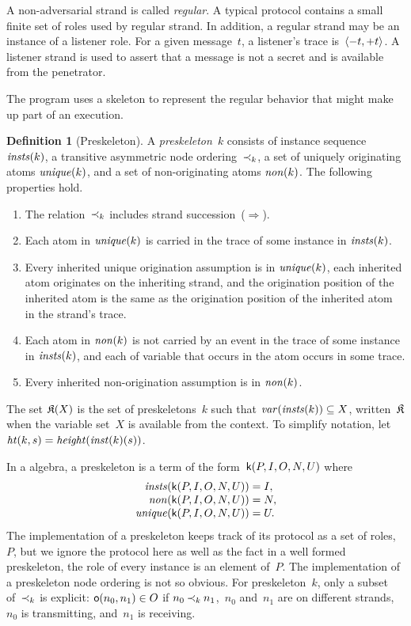 \documentclass[12pt]{article}
\theoremstyle{definition}
\newtheorem{defn}{Definition}[section]
\begin{document}
A non-adversarial strand is called 
\emph{regular}.  A typical protocol contains a small finite
set of roles used by regular strand.  In addition, a regular strand
may be an instance of a listener role.  For a given message~$t$, a
listener's trace is~$\langle\mathord - t,\mathord + t\rangle$.  A listener strand is
used to assert that a message is not a secret and is available from
the penetrator.

The {\cpsa} program uses a skeleton to represent the regular behavior
that might make up part of an execution.

\begin{defn}[Preskeleton]
A \emph{preskeleton}~$k$ consists of instance sequence
$\operatorname{\mathit{insts}}(k)$, a transitive asymmetric node ordering~$\mathbin{\prec_{k}}$, a
set of uniquely originating atoms $\operatorname{\mathit{unique}}(k)$, and a set of
non-originating atoms $\operatorname{\mathit{non}}(k)$.  The following properties hold.
\begin{enumerate}
\item The relation~$\mathbin{\prec_{k}}$ includes strand succession~($\Rightarrow$).
\item Each atom in $\operatorname{\mathit{unique}}(k)$ is carried in the trace of some
  instance in $\operatorname{\mathit{insts}}(k)$.
\item Every inherited unique origination assumption is in
  $\operatorname{\mathit{unique}}(k)$, each inherited atom originates on the
  inheriting strand, and the origination position of the inherited
  atom is the same as the origination position of the inherited atom
  in the strand's trace.
\item Each atom in $\operatorname{\mathit{non}}(k)$ is not carried by an event in the
  trace of some instance in $\operatorname{\mathit{insts}}(k)$, and each of
  variable that occurs in the atom occurs in some trace.
\item Every inherited non-origination assumption is in $\operatorname{\mathit{non}}(k)$.
\end{enumerate}
\end{defn}

The set $\mathfrak K(X)$ is the set of preskeletons~$k$ such that
$\operatorname{\mathit{var}}(\operatorname{\mathit{insts}}(k))\subseteq X$, written~$\mathfrak K$ when the
variable set~$X$ is available from the context.  To simplify notation,
let $\operatorname{\mathit{ht}}(k,s)=\operatorname{\mathit{height}}(\operatorname{\mathit{inst}}(k)(s))$.

In a {\cpsa} algebra, a preskeleton is a term of the
form~$\operatorname{\mathsf{k}}(P,I,O,N,U)$ where
$$\begin{array}{r@{}c@{}l}
\fn{insts}(\cn{k}(P,I,O,N,U))&{}={}&I,\\
\fn{non}(\cn{k}(P,I,O,N,U))&{}={}&N,\\
\fn{unique}(\cn{k}(P,I,O,N,U))&{}={}&U.
\end{array}$$
The implementation of a preskeleton keeps track of its protocol as a
set of roles, $P$, but we ignore the protocol here as well as the fact
in a well formed preskeleton, the role of every instance is an element
of~$P$.  The implementation of a preskeleton node ordering is not so
obvious.  For preskeleton~$k$, only a subset of~$\mathbin{\prec_{k}}$ is
explicit: $\operatorname{\mathsf{o}}(n_0,n_1)\in O$ if $n_0\mathbin{\prec_{k}}n_1$,~$n_0$ and~$n_1$
are on different strands,~$n_0$ is transmitting, and~$n_1$ is
receiving.
\end{document}
